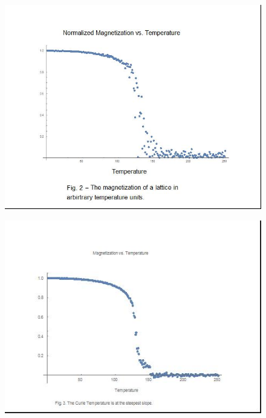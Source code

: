 \documentclass[a4paper]{article}
\begin{document}
\begin{figure}
\centering
\includegraphics[width = 15cm]{Mag_v_Temp_single_iter.jpg}
\end{figure}

\begin{figure}
\centering
\includegraphics[width = 15cm]{fig4.jpg}
\end{figure}
\end{document}
